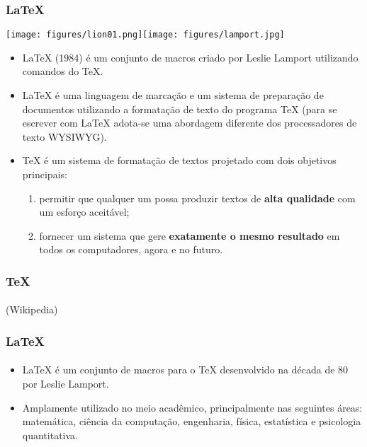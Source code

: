 \begin{frame}
\frametitle{\LaTeX{}}

\texttt{[image: figures/lion01.png]}\hfill\texttt{[image: figures/lamport.jpg]}
\begin{itemize}
  \item \LaTeX{} (1984) é um conjunto de macros criado por Leslie Lamport utilizando comandos do \TeX{}.
  \item \LaTeX{} é uma linguagem de marcação e um sistema de preparação de documentos utilizando a formatação de texto do programa \TeX{} (para se escrever com \LaTeX{} adota-se uma abordagem diferente dos processadores de texto WYSIWYG).
  \item \TeX{} é um sistema de formatação de textos projetado com dois objetivos principais:
  \begin{enumerate}
      \item permitir que qualquer um possa produzir textos de \textbf{alta qualidade} com um esforço aceitável;
      \item fornecer um sistema que gere \textbf{exatamente o mesmo resultado} em todos os computadores, agora e no futuro.
  \end{enumerate}
\end{itemize}
\end{frame}



\begin{frame}
\frametitle{\TeX{}}
\framesubtitle{}
\begin{flushleft}
\hspace{1.1em}\footnotesize{(Wikipedia)}
\end{flushleft}
\end{frame}


\begin{frame}
\frametitle{\LaTeX{}}
\framesubtitle{}
\begin{itemize}
  \item \LaTeX{} é um conjunto de macros para o \TeX{} desenvolvido na década de 80 por Leslie Lamport.
  \item Amplamente utilizado no meio acadêmico, principalmente nas seguintes áreas: matemática, ciência da computação, engenharia, física, estatística e psicologia quantitativa.
\end{itemize}
\end{frame}



